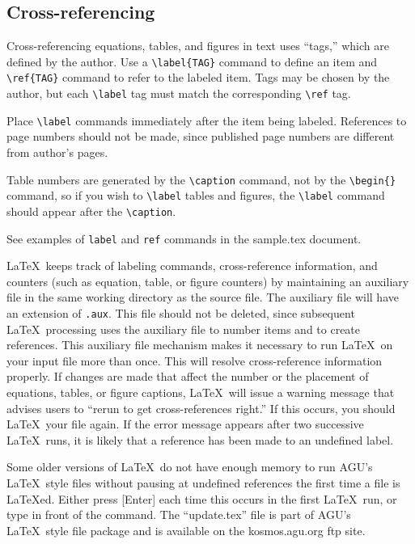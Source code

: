 \begin{article}
\section{Cross-referencing}

Cross-referencing equations, tables, and figures in 
text uses ``tags,'' which are defined by the author.
Use a \verb"\label{TAG}" command to define an item 
and \verb"\ref{TAG}" command to refer to the labeled 
item.  Tags may be chosen by the author, but each 
\verb"\label" tag must match the corresponding 
\verb"\ref" tag.

Place \verb"\label" commands immediately after 
the item being labeled.  References to page numbers 
should not be made, since published page numbers 
are different from author's pages.

Table numbers are generated by the \verb"\caption" 
command, not by the \verb"\begin{}" command, so if 
you wish to \verb"\label" tables and figures, the 
\verb"\label" command should appear after the 
\verb"\caption". 

See examples of \verb"label" and \verb"ref" commands in 
the sample.tex document.

\LaTeX\ keeps track of labeling commands, cross-reference
information, and counters (such as equation, table, or 
figure counters) by maintaining an auxiliary file in the 
same working directory as the source file.  The auxiliary
file will have an extension of {\tt .aux}.  This file 
should not be deleted, since subsequent \LaTeX\ processing 
uses the auxiliary file to number items and to create 
references.  This auxiliary file mechanism makes it 
necessary to run \LaTeX\ on your input file more than 
once.  This will resolve cross-reference information 
properly.  If changes are made that affect the number 
or the placement of equations, tables, or figure captions,
\LaTeX\ will issue a warning message that advises users 
to ``rerun to get cross-references right.'' If this occurs,
you should \LaTeX\ your file again.  If the error message
appears after two successive \LaTeX\ runs, it is likely
that a reference has been made to an undefined label.

Some older versions of \LaTeX\ do not have enough
memory to run AGU's \LaTeX\ style files without pausing
at undefined references the first time a file is
{\LaTeX}ed.  Either press [Enter] each time this occurs
in the first \LaTeX\ run, or type \verb""
in front of the \verb"" command.  The
``update.tex'' file is part of AGU's \LaTeX\ style file
package and is available on the kosmos.agu.org ftp site.



\end{article}
